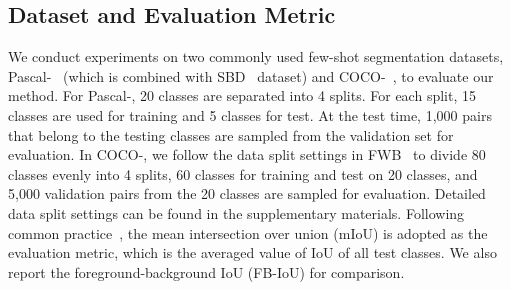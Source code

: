 \documentclass{article}
\begin{document}
\subsection{Dataset and Evaluation Metric}
\label{sec:datasets}
We conduct experiments on two commonly used few-shot segmentation datasets, Pascal-~\cite{everingham2010pascal} (which is combined with SBD~\cite{hariharan2014sbd} dataset) and COCO-~\cite{mscoco}, to evaluate our method. For Pascal-, 20 classes are separated into 4 splits. For each split, 15 classes are used for training and 5 classes for test. At the test time, 1,000 pairs that belong to the testing classes are sampled from the validation set for evaluation. In COCO-, we follow the data split settings in FWB~\cite{nguyen2019FWB} to divide 80 classes evenly into 4 splits, 60 classes for training and test on 20 classes, and 5,000 validation pairs from the 20 classes are sampled for evaluation. Detailed data split settings can be found in the supplementary materials. Following common practice~\cite{tian2020pfenet,wang2019panet,zhang2020sgone}, the mean intersection over union (mIoU) is adopted as the evaluation metric, which is the averaged value of IoU of all test classes. We also report the foreground-background IoU (FB-IoU) for comparison.
\end{document}
